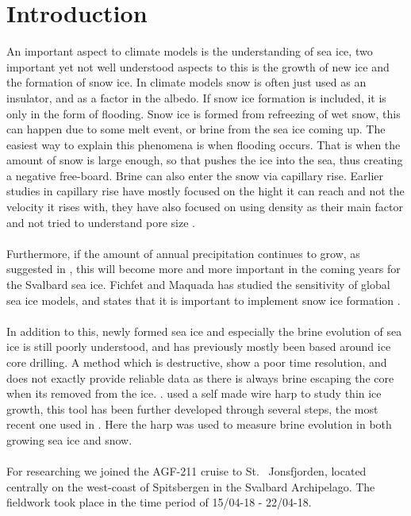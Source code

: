 
\clearpage

\section{Introduction}


An important aspect to climate models is the understanding of sea ice, two important yet not well understood aspects to this is the growth of new ice and the formation of snow ice. In climate models snow is often just used as an insulator, and as a factor in the albedo. If snow ice formation is included, it is only in the form of flooding. Snow ice is formed from refreezing of wet snow, this can happen due to some melt event, or brine from the sea ice coming up. The easiest way to explain this phenomena is when flooding occurs. That is when the amount of snow is large enough, so that pushes the ice into the sea, thus creating a negative free-board. Brine can also enter the snow via capillary rise. Earlier studies in capillary rise have mostly focused on the hight it can reach and not the velocity it rises with, they have also focused on using density as their main factor and not tried to understand pore size \textcite{Capill}.\\
\\
Furthermore, if the amount of annual precipitation continues to grow, as suggested in \textcite{Forland}, this will become more and more important in the coming years for the Svalbard sea ice. Fichfet and Maquada has studied the sensitivity of global sea ice models, and states that it is important to implement snow ice formation \textcite{Fichefet}. \\
\\
In addition to this, newly formed sea ice and especially the brine evolution of sea ice is still poorly understood, and has previously mostly been based around ice core drilling. A method which is destructive, show a poor time resolution, and does not exactly provide reliable data as there is always brine escaping the core when its removed from the ice. \textcite{Fuchs}. \textcite{Notz} used a self made wire harp to study thin ice growth, this tool has been further developed through several steps, the most recent one used in \textcite{Fuchs}. Here the harp was used to measure brine evolution in both growing sea ice and snow.\\
\\
For researching we joined the AGF-211 cruise to St. \ Jonsfjorden, located centrally on the west-coast of Spitsbergen in the Svalbard Archipelago. The fieldwork took place in the time period of 15/04-18 \-- 22/04-18.

